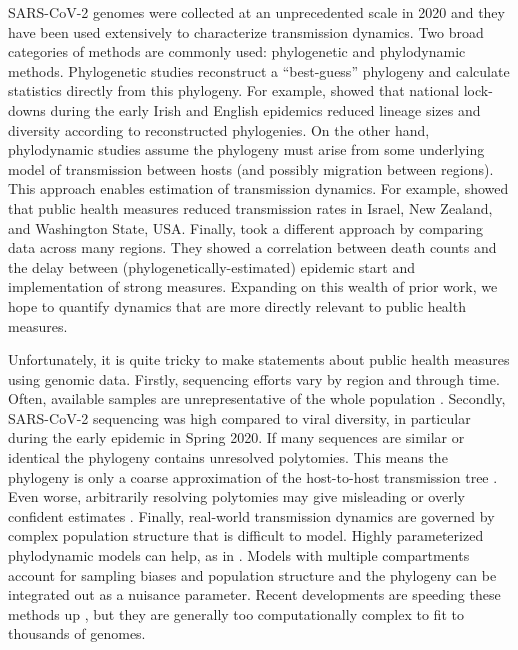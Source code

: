 \documentclass[9pt,twoside,lineno]{pnas-new} %
\begin{document}
SARS-CoV-2 genomes were collected at an unprecedented scale in 2020 \cite{Alm2020} and they have been used extensively to characterize transmission dynamics. Two broad categories of methods are commonly used: phylogenetic and phylodynamic methods. Phylogenetic studies reconstruct a ``best-guess'' phylogeny and calculate statistics directly from this phylogeny. For example, \cite{Mallon2020, DuPlessis2021} showed that national lock-downs during the early Irish and English epidemics reduced lineage sizes and diversity according to reconstructed phylogenies. On the other hand, phylodynamic studies assume the phylogeny must arise from some underlying model of transmission between hosts (and possibly migration between regions). This approach enables estimation of transmission dynamics. For example, \cite{Miller2020, Geoghegan2020a, Muller2020a} showed that public health measures reduced transmission rates in Israel, New Zealand, and Washington State, USA. Finally, \cite{Ragonnet-Cronin2021} took a different approach by comparing data across many regions. They showed a correlation between death counts and the delay between (phylogenetically-estimated) epidemic start and implementation of strong measures. Expanding on this wealth of prior work, we hope to quantify dynamics that are more directly relevant to public health measures.

Unfortunately, it is quite tricky to make statements about public health measures using genomic data. Firstly, sequencing efforts vary by region and through time. Often, available samples are unrepresentative of the whole population \cite{Villabona-Arenas2020, DeMaio2015}. Secondly, SARS-CoV-2 sequencing was high compared to viral diversity, in particular during the early epidemic in Spring 2020. If many sequences are similar or identical the phylogeny contains unresolved polytomies. This means the phylogeny is only a coarse approximation of the  host-to-host transmission tree \cite{Villabona-Arenas2020}. Even worse, arbitrarily resolving polytomies may give misleading or overly confident estimates \cite{Morel2021}. Finally, real-world transmission dynamics are governed by complex population structure that is difficult to model. Highly parameterized phylodynamic models can help, as in \cite{Miller2020, Geoghegan2020a, Muller2020a}. Models with multiple compartments account for sampling biases and population structure and the phylogeny can be integrated out as a nuisance parameter. Recent developments are speeding these methods up \cite{Lemey2021}, but they are generally too computationally complex to fit to thousands of genomes.
\end{document}
